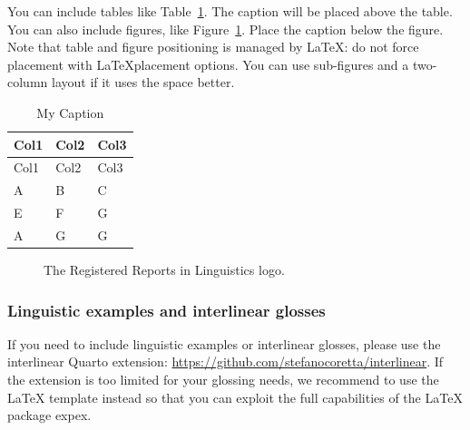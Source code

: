 \documentclass[
]{rrling}
\begin{document}
You can include tables like Table~\ref{tbl-letters}. The caption will be
placed above the table. You can also include figures, like
Figure~\ref{fig-example}. Place the caption below the figure. Note that
table and figure positioning is managed by LaTeX: do not force placement
with LaTeXplacement options. You can use sub-figures and a two-column
layout if it uses the space better.

\begin{longtable}[]{@{}lll@{}}
\caption{My Caption}\label{tbl-letters}\tabularnewline
\toprule\noalign{}
Col1 & Col2 & Col3 \\
\midrule\noalign{}
\endfirsthead
\toprule\noalign{}
Col1 & Col2 & Col3 \\
\midrule\noalign{}
\endhead
\bottomrule\noalign{}
\endlastfoot
A & B & C \\
E & F & G \\
A & G & G \\
\end{longtable}

\begin{figure}


\caption{\label{fig-example}The Registered Reports in Linguistics logo.}

\end{figure}%

\subsubsection*{Linguistic examples and interlinear
glosses}\label{linguistic-examples-and-interlinear-glosses}

If you need to include linguistic examples or interlinear glosses,
please use the interlinear Quarto extension:
\url{https://github.com/stefanocoretta/interlinear}. If the extension is
too limited for your glossing needs, we recommend to use the LaTeX
template instead so that you can exploit the full capabilities of the
LaTeX package expex.
\end{document}
